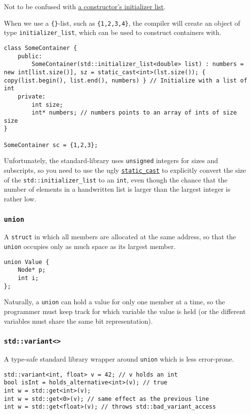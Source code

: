 \documentclass[8pt, table, xcdraw]{article}%
\begin{document}
Not to be confused with \hyperref[initializerlist]{a constructor's initializer list}.

When we use a \lstinline|{}|-list, such as \lstinline|{1,2,3,4}|, the compiler will create an object of type \lstinline{initializer_list}, which can be used to construct containers with.

\begin{lstlisting}
class SomeContainer {
    public:
        SomeContainer(std::initializer_list<double> list) : numbers = new int[list.size()], sz = static_cast<int>(lst.size()); { copy(list.begin(), list.end(), numbers) } // Initialize with a list of int
    private:
        int size;
        int* numbers; // numbers points to an array of ints of size size
}

SomeContainer sc = {1,2,3};
\end{lstlisting}

Unfortunately, the standard-library uses \lstinline{unsigned} integers for sizes and subscripts, so you need to use the ugly \hyperref[staticcast]{\lstinline{static_cast}} to explicitly convert the size of the \lstinline{std::initializer_list} to an \lstinline{int}, even though the chance that the number of elements in a handwritten list is larger than the largest integer is rather low. 

\subsubsection{\lstinline{union}}
A \lstinline{struct} in which all members are allocated at the same address, so that the \lstinline{union} occupies only as much space as its largest member.

\begin{lstlisting}
union Value {
    Node* p;
    int i;
};
\end{lstlisting}

Naturally, a \lstinline{union} can hold a value for only one member at a time, so the programmer must keep track for which variable the value is held (or the different variables must share the same bit representation).

\subsubsection{\lstinline{std::variant<>}}
A type-safe standard library wrapper around \lstinline{union} which is less error-prone.

\begin{lstlisting}
std::variant<int, float> v = 42; // v holds an int
bool isInt = holds_alternative<int>(v); // true
int w = std::get<int>(v);
int w = std::get<0>(v); // same effect as the previous line
int w = std::get<float>(v); // throws std::bad_variant_access
\end{lstlisting}
\end{document}
